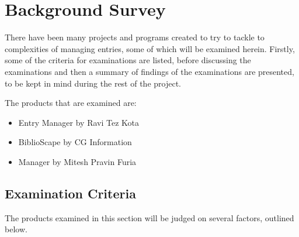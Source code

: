 \chapter{Background Survey}
\label{backgrnd}
There have been many projects and programs created to try to tackle to complexities of managing \bibtex{} entries, some of which will be examined herein.  Firstly, some of the criteria for examinations are listed, before discussing the examinations and then a summary of findings of the examinations are presented, to be kept in mind during the rest of the project.

The products that are examined are:
\begin{itemize}
	\item \bibtex{} Entry Manager by Ravi Tez Kota
	\item BiblioScape by CG Information
	\item \bibtex{} Manager by Mitesh Pravin Furia 
\end{itemize}

\section{Examination Criteria}
The products examined in this section will be judged on several factors, outlined below.

